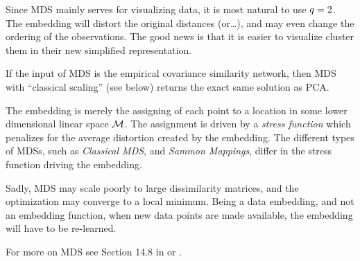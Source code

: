 Since MDS mainly serves for visualizing data, it is most natural to use $q=2$. 
The embedding will distort the original distances (or\dots), and may even change the ordering of the observations. The good news is that it is easier to visualize \andor cluster them in their new simplified representation. 

If the input of MDS is the empirical covariance similarity network, then MDS with ``classical scaling'' (see below) returns the exact same solution as PCA.

The embedding is merely the assigning of each point to a location in some lower dimensional linear space $\mathcal{M}$. 
The assignment is driven by a \emph{stress function} which penalizes for the average distortion created by the embedding.
The different types of MDSs, such as \emph{Classical MDS}, and \emph{Sammon Mappings}, differ in the stress function driving the embedding.

Sadly, MDS may scale poorly to large dissimilarity matrices, and the optimization may converge to a local minimum.
Being a data embedding, and not an embedding function, when new data points are made available, the embedding will have to be re-learned.

For more on MDS see Section 14.8 in \cite{hastie_elements_2003} or \cite{borg_modern_2005}.



